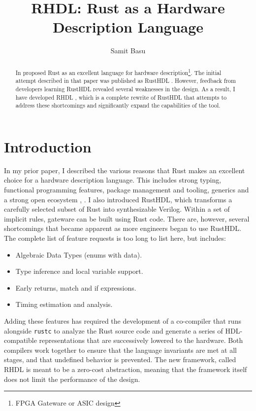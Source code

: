 \documentclass[sigplan,screen,sigconf]{acmart}
\author{Samit Basu}
\affiliation{
  basu.samit@gmail.com
  \country{Fremont CA, USA}
}
\begin{document}
\title{RHDL: Rust as a Hardware Description Language}

\begin{abstract}
In \cite{b13} proposed Rust as an excellent language for hardware description\footnote{FPGA Gateware or ASIC design}.  The initial attempt described in that paper was published as RustHDL \cite{b6}.  However, feedback from developers learning RustHDL revealed several weaknesses in the design.  As a result, I have developed RHDL \cite{b10}, which is a complete rewrite of RustHDL that attempts to address these shortcomings and significantly expand the capabilities of the tool.
\end{abstract}

\maketitle

\section{Introduction}

In my prior paper, I described the various reasons that Rust makes an excellent choice for a hardware description language.  This includes strong typing, functional programming features, package management and tooling, generics and a strong open ecosystem \cite{b0}, \cite{b9}. I also introduced RustHDL, which transforms a carefully selected subset of Rust into synthesizable Verilog.  Within a set of implicit rules, gateware can be built using Rust code.  There are, however, several shortcomings that became apparent as more engineers began to use RustHDL.  The complete list of feature requests is too long to list here, but includes:

\begin{itemize}
\item Algebraic Data Types (enums with data).
\item Type inference and local variable support.
\item Early returns, match and if expressions.
\item Timing estimation and analysis.
\end{itemize}

Adding these features has required the development of a co-compiler that runs alongside \verb|rustc| to analyze the Rust source code and generate a series of HDL-compatible representations that are successively lowered to the hardware. Both compilers work together to ensure that the language invariants are met at all stages, and that undefined behavior is prevented.  The new framework, called RHDL is meant to be a zero-cost abstraction, meaning that the framework itself does not limit the performance of the design.
\end{document}
